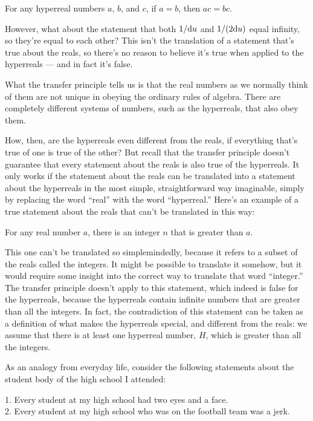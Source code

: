 \begin{indentedblock}
For any hyperreal numbers $a$, $b$, and $c$, if $a=b$, then $ac=bc$.
\end{indentedblock}

However, what about the statement that both $1/\textup{d} u$ and $1/(2\textup{d} u)$ equal infinity, so they're
equal to each other? This isn't the translation of a statement that's true about the reals, so there's
no reason to believe it's true when applied to the hyperreals --- and in fact it's false.

What the transfer principle tells us is that the real numbers as we normally
think of them are not unique in obeying the ordinary rules of algebra. There are completely different
systems of numbers, such as the hyperreals, that also obey them.

How, then, are the hyperreals even
different from the reals, if everything that's true of one is true of the other? But recall that
the transfer principle doesn't guarantee that every statement about the reals is also true of the
hyperreals. It only works if the statement about the reals can be translated into a statement
about the hyperreals in the most simple, straightforward way imaginable, simply by replacing
the word ``real'' with the word ``hyperreal.'' Here's an example of a true statement about the reals that
can't be translated in this way:

\begin{indentedblock}
For any real number $a$, there is an integer $n$ that is greater than $a$.
\end{indentedblock}

This one can't be translated so simplemindedly, because it refers to a subset of the reals called
the integers. It might be possible to translate it somehow, but it would require some insight into
the correct way to translate that word ``integer.'' The transfer principle doesn't apply to this
statement, which indeed is false for the hyperreals, because the hyperreals contain infinite
numbers that are greater than all the integers. In fact, the contradiction of this statement can be
taken as a definition of what makes the hyperreals special, and different from the reals: we assume
that there is at least one hyperreal number, $H$, which is greater than all the integers.

As an analogy from everyday life, consider the following statements about the student body of the
high school I attended:

\begin{indentedblock}
1. Every student at my high school had two eyes and a face.\\
2. Every student at my high school who was on the football team was a jerk.
\end{indentedblock}

